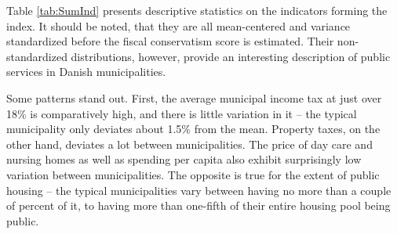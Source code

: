 \documentclass[a4paper,12pt]{article}
\begin{document}


Table \ref{tab:SumInd} presents descriptive statistics on the indicators forming the index. It should be noted, that they are all mean-centered and variance standardized before the fiscal conservatism score is estimated. Their non-standardized distributions, however, provide an interesting description of public services in Danish municipalities.

Some patterns stand out. First, the average municipal income tax at just over 18\% is comparatively high, and there is little variation in it -- the typical municipality only deviates about 1.5\% from the mean. Property taxes, on the other hand, deviates a lot between municipalities. The price of day care and nursing homes as well as spending per capita also exhibit surprisingly low variation between municipalities. The opposite is true for the extent of public housing -- the typical municipalities vary between having no more than a couple of percent of it, to having more than one-fifth of their entire housing pool being public.
\end{document}
